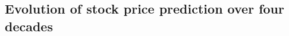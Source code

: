 \documentclass[pdflatex,sn-mathphys-num]{sn-jnl}%
\theoremstyle{thmstyleone}%
\theoremstyle{thmstyletwo}%
\theoremstyle{thmstylethree}%
\begin{document}
\subsection{Evolution of stock price prediction over four decades} 


\end{document}
